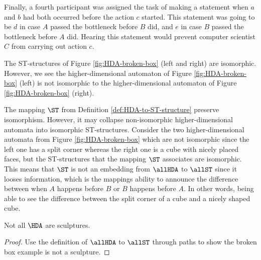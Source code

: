 \begin{example}
        Finally, a fourth participant was assigned the task of making a statement when $a$ and $b$ had both occurred before the action $c$ started. This statement was going to be $d$ in case $A$ passed the bottleneck before $B$ did, and $e$ in case $B$ passed the bottleneck before $A$ did. Hearing this statement would prevent computer scientist $C$ from carrying out action $c$.
    
        The ST-structures of Figure \ref{fig:HDA-broken-box} (left and right) are isomorphic. However, we see the higher-dimensional automaton of Figure \ref{fig:HDA-broken-box} (left) is not isomorphic to the higher-dimensional automaton of Figure \ref{fig:HDA-broken-box} (right).
    \end{example}

    The mapping $\ST$ from Definition \ref{def:HDA-to-ST-structure} preserve isomorphism. However, it may collapse non-isomorphic higher-dimensional automata into isomorphic ST-structures. Consider the two higher-dimensional automata from Figure \ref{fig:HDA-broken-box} which are not isomorphic since the left one has a split corner whereas the right one is a cube with nicely placed faces, but the ST-structures that the mapping $\ST$ associates are isomorphic. This means that $\ST$ is not an embedding from $\allHDA$ to $\allST$ since it looses information, which is the mappings ability to announce the difference between when $A$ happens before $B$ or $B$ happens before $A$. In other words, being able to see the difference between the split corner of a cube and a nicely shaped cube.


    
    \begin{theorem}
        \label{th:non-sculpting}
        Not all $\HDA$ are sculptures.
    \end{theorem}
    
    \begin{proof}
        Use the definition of $\allHDA$ to $\allST$ through paths to show the broken box example is not a sculpture.
    \end{proof}